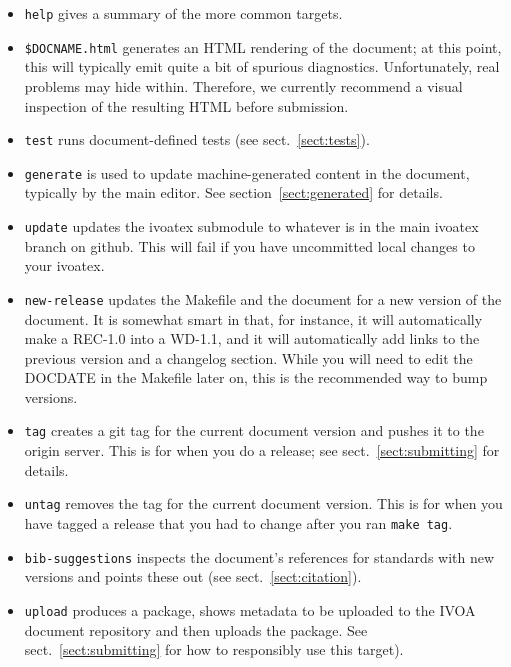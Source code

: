 \documentclass[11pt,a4paper]{ivoa}
\begin{document}
\begin{itemize}
\item \texttt{help} gives a summary of the more common targets.

\item \texttt{\$DOCNAME.html} generates an HTML rendering of the
document; at this point, this will typically emit quite a bit of
spurious diagnostics.  Unfortunately, real problems may hide within.
Therefore, we currently recommend a visual inspection of the resulting
HTML before submission.

\item \texttt{test} runs document-defined tests (see
sect.~\ref{sect:tests}).

\item \texttt{generate} is used to update machine-generated content in
the document, typically by the main editor.  See
section~\ref{sect:generated} for details.

\item \texttt{update} updates the ivoatex submodule to whatever is in
the main ivoatex branch on github.  This will fail if you have
uncommitted local changes to your ivoatex.

\item \texttt{new-release} updates the Makefile and the document for a
new version of the document.  It is somewhat smart in that, for
instance, it will automatically make a REC-1.0 into a WD-1.1, and it
will automatically add links to the previous version and a changelog
section.  While you will need to edit the DOCDATE in the Makefile later on, this
is the recommended way to bump versions.

\item \texttt{tag} creates a git tag for the current document version and
pushes it to the origin server.  This is for when you do a release; see
sect.~\ref{sect:submitting} for details.

\item \texttt{untag} removes the tag for the current document version.
This is for when you have tagged a release that you had to change after
you ran \verb|make tag|.

\item \texttt{bib-suggestions} inspects the document's references for
standards with new versions and points these out (see
sect.~\ref{sect:citation}).

\item \texttt{upload} produces a package, shows metadata to be uploaded to the
IVOA document repository and
then uploads the package. See sect.~\ref{sect:submitting} for how to
responsibly use this target).


\end{itemize}
\end{document}
